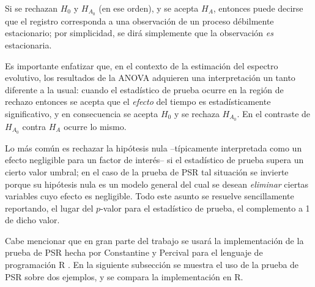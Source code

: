 \documentclass[12pt,letterpaper]{book}
\begin{document}

Si se rechazan $H_0$ y $H_{A_0}$ (en ese orden), y se acepta $H_A$, entonces puede decirse que el registro corresponda a una observación de un proceso débilmente estacionario;
por simplicidad, se dirá simplemente que la observación \textit{es} estacionaria.

Es importante enfatizar que, en el contexto de la estimación del espectro evolutivo, los resultados de la ANOVA adquieren una interpretación un tanto diferente a la usual: 
cuando el estadístico de prueba 
ocurre en la región de rechazo 
entonces se acepta que el \textit{efecto} del tiempo es estadísticamente significativo, y en consecuencia se acepta $H_0$ y se rechaza $H_{A_0}$. 
%
En el contraste de $H_{A_0}$ contra $H_A$ ocurre lo mismo.

Lo más común es rechazar la hipótesis nula --típicamente interpretada como un efecto negligible para un factor de interés-- si el estadístico de prueba supera un cierto valor umbral; en el caso de la prueba de PSR tal situación se invierte porque su hipótesis nula es un modelo general 
del cual se desean \textit{eliminar} ciertas variables cuyo efecto es negligible.
%
Todo este asunto se resuelve sencillamente reportando, el lugar del $p$-valor para el estadístico de prueba, el complemento a 1 de dicho valor.

Cabe mencionar que en gran parte del trabajo se usará la implementación de la prueba de PSR hecha por Constantine y Percival para el lenguaje de programación R \cite{R_fractal}.
%
En la siguiente subsección se muestra el uso de la prueba de PSR sobre dos ejemplos, y se compara la implementación en R.

\end{document}
